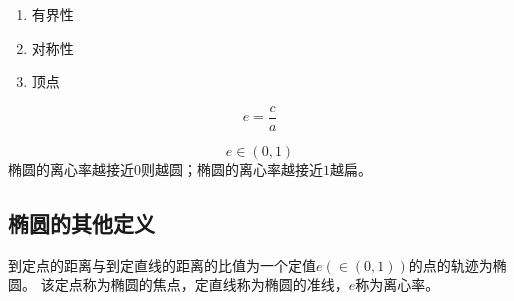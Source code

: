 \begin{example}
    
\end{example}
\begin{character}[椭圆的性质]
\begin{enumerate}[(1)]
    \item 有界性
    \item 对称性
    \item 顶点
\end{enumerate}
\end{character}
\begin{definition}[离心率]
    \begin{equation}
        e=\frac{c}{a}
    \end{equation}
\end{definition}
\begin{theorem}[椭圆的离心率]
    \begin{equation}
        e\in (0,1)
    \end{equation}
    椭圆的离心率越接近\(0\)则越圆；椭圆的离心率越接近\(1\)越扁。
\end{theorem}

\begin{definition}[通径]
    
\end{definition}

\clearpage












\subsection{椭圆的其他定义}
\begin{definition}[椭圆的第二定义]
    到定点的距离与到定直线的距离的比值为一个定值\(e(\in(0,1))\)的点的轨迹为椭圆。
    该定点称为椭圆的焦点，定直线称为椭圆的准线，\(e\)称为离心率。
\end{definition}

